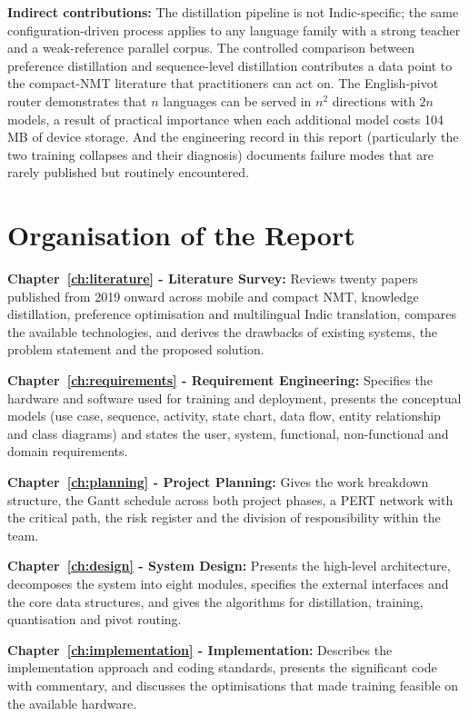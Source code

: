 \textbf{Indirect contributions:} The distillation pipeline is not
Indic-specific; the same configuration-driven process applies to any
language family with a strong teacher and a weak-reference parallel corpus. The
controlled comparison between preference distillation and sequence-level
distillation contributes a data point to the compact-NMT literature that
practitioners can act on. The English-pivot router demonstrates that $n$
languages can be served in $n^2$ directions with $2n$ models, a result of
practical importance when each additional model costs 104\,MB of device storage.
And the engineering record in this report (particularly the two training
collapses and their diagnosis) documents failure modes that are rarely
published but routinely encountered.

\section{Organisation of the Report}
\label{sec:organisation}

\textbf{Chapter~\ref{ch:literature} - Literature Survey:} Reviews twenty papers
published from 2019 onward across mobile and compact NMT, knowledge
distillation, preference optimisation and multilingual Indic translation,
compares the available technologies, and derives the drawbacks of existing
systems, the problem statement and the proposed solution.

\textbf{Chapter~\ref{ch:requirements} - Requirement Engineering:} Specifies the
hardware and software used for training and deployment, presents the conceptual
models (use case, sequence, activity, state chart, data flow, entity
relationship and class diagrams) and states the user, system, functional,
non-functional and domain requirements.

\textbf{Chapter~\ref{ch:planning} - Project Planning:} Gives the work breakdown
structure, the Gantt schedule across both project phases, a PERT network with
the critical path, the risk register and the division of responsibility within
the team.

\textbf{Chapter~\ref{ch:design} - System Design:} Presents the high-level
architecture, decomposes the system into eight modules, specifies the external
interfaces and the core data structures, and gives the algorithms for
distillation, training, quantisation and pivot routing.

\textbf{Chapter~\ref{ch:implementation} - Implementation:} Describes the
implementation approach and coding standards, presents the significant code with
commentary, and discusses the optimisations that made training feasible on the
available hardware.

